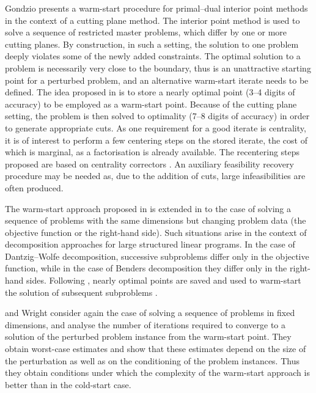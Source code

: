 Gondzio \cite{Gondzio98} presents a warm-start procedure for primal--dual
interior point methods in the context of a cutting plane method.
The interior point method is used to solve a sequence of restricted
master problems, which differ by one or more cutting planes.
By construction, in such a setting, the solution to one problem
deeply violates some of the newly added constraints.
The optimal solution to a problem is necessarily very close 
to the boundary, thus is an unattractive starting point 
for a perturbed problem, and an alternative warm-start 
iterate needs to be defined.
The idea proposed in \cite{Gondzio98} is to store a nearly optimal 
point (3--4 digits of accuracy) to be employed as a warm-start point.
Because of the cutting plane setting, the problem is then solved to
optimality (7--8 digits of accuracy) in order to generate appropriate cuts.
As one requirement for a good iterate is centrality, it is of interest 
to perform a few centering steps on the stored iterate, the cost of 
which is marginal, as a factorisation is already available. The 
recentering steps proposed are based on
centrality correctors \cite{Gondzio96}.
An auxiliary feasibility recovery procedure may be needed as, due to 
the addition of cuts, large infeasibilities are often produced.

The warm-start approach proposed in \cite{Gondzio98} is extended
in \cite{GondzioVial} to the case of solving a sequence of problems 
with the same dimensions but changing problem data (the objective 
function or the right-hand side). Such situations arise 
in the context of decomposition approaches for large structured 
linear programs. 
In the case of Dantzig--Wolfe decomposition, successive subproblems 
differ only in the objective function, while in the case 
of Benders decomposition they differ only in the right-hand sides.
Following \cite{Gondzio98}, nearly optimal points are saved and used 
to warm-start the solution of subsequent subproblems \cite{GondzioVial}.


\yildirim and Wright \cite{YildirimWright} consider again the case 
of solving a sequence of problems in fixed dimensions, and
analyse the number of iterations required to converge to a 
solution of the perturbed problem instance from the warm-start point.
They obtain worst-case estimates and
show that these estimates depend on the size of the perturbation 
as well as on the conditioning of the problem 
instances. Thus they obtain conditions under which the complexity 
of the warm-start approach is better than in the cold-start case.

